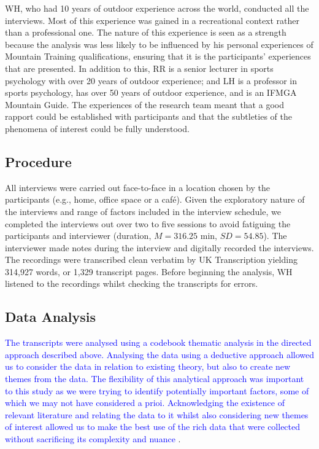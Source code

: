 \documentclass[
  12pt,
  a4paper,
]{book}
\begin{document}
WH, who had 10 years of outdoor experience across the world, conducted all the interviews. Most of this experience was gained in a recreational context rather than a professional one. The nature of this experience is seen as a strength because the analysis was less likely to be influenced by his personal experiences of Mountain Training qualifications, ensuring that it is the participants' experiences that are presented. In addition to this, RR is a senior lecturer in sports psychology with over 20 years of outdoor experience; and LH is a professor in sports psychology, has over 50 years of outdoor experience, and is an IFMGA Mountain Guide. The experiences of the research team meant that a good rapport could be established with participants and that the subtleties of the phenomena of interest could be fully understood.

\hypertarget{procedure}{%
\subsection{Procedure}\label{procedure}}

All interviews were carried out face-to-face in a location chosen by the participants (e.g., home, office space or a café). Given the exploratory nature of the interviews and range of factors included in the interview schedule, we completed the interviews out over two to five sessions to avoid fatiguing the participants and interviewer (duration, \(M = 316.25\) min, \(SD = 54.85\)). The interviewer made notes during the interview and digitally recorded the interviews. The recordings were transcribed clean verbatim by UK Transcription yielding 314,927 words, or 1,329 transcript pages. Before beginning the analysis, WH listened to the recordings whilst checking the transcripts for errors.

\hypertarget{data-analysis}{%
\subsection{Data Analysis}\label{data-analysis}}

\textcolor{blue}{The transcripts were analysed using a codebook thematic analysis} \citep[cf.~][]{Braun2019b} \textcolor{blue}{in the directed approach described above. Analysing the data using a  deductive approach allowed us to consider the data in relation to existing theory, but also to create new themes from the data. The flexibility of this analytical approach was important to this study as we were trying to identify potentially important factors, some of which we may not have considered a prioi. Acknowledging the existence of relevant literature and relating the data to it whilst also considering new themes of interest allowed us to make the best use of the rich data that were collected without sacrificing its complexity and nuance} \citep[cf.~][]{Feilzer2010}.
\end{document}
